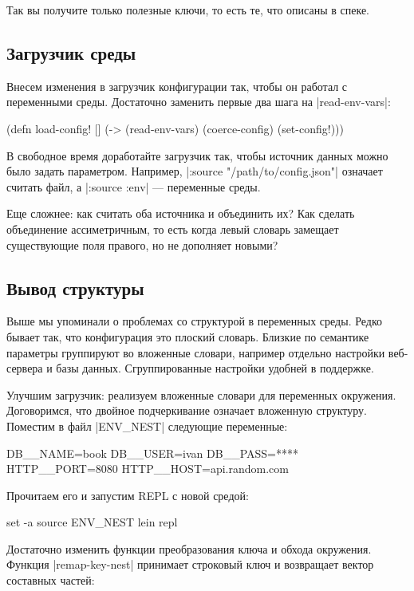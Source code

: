 Так вы получите только полезные ключи, то есть те, что описаны в спеке.

\subsection{Загрузчик среды}

Внесем изменения в загрузчик конфигурации так, чтобы он работал с переменными
среды. Достаточно заменить первые два шага на \spverb|read-env-vars|:

\begin{code}
(defn load-config!
  []
  (-> (read-env-vars)
      (coerce-config)
      (set-config!)))
\end{code}

В свободное время доработайте загрузчик так, чтобы источник данных можно было
задать параметром. Например, \spverb|:source "/path/to/config.json"| означает считать
файл, а \spverb|:source :env| — переменные среды.

Еще сложнее: как считать оба источника и объединить их? Как сделать объединение
ассиметричным, то есть когда левый словарь замещает существующие поля правого,
но не дополняет новыми?

\subsection{Вывод структуры}

Выше мы упоминали о проблемах со структурой в переменных среды. Редко бывает
так, что конфигурация это плоский словарь. Близкие по семантике параметры
группируют во вложенные словари, например отдельно настройки веб-сервера и базы
данных. Сгруппированные настройки удобней в поддержке.

Улучшим загрузчик: реализуем вложенные словари для переменных
окружения. Договоримся, что двойное подчеркивание означает вложенную
структуру. Поместим в файл \spverb|ENV_NEST| следующие переменные:

\begin{code}
DB__NAME=book
DB__USER=ivan
DB__PASS=****
HTTP__PORT=8080
HTTP__HOST=api.random.com
\end{code}

Прочитаем его и запустим REPL с новой средой:

\begin{code}
set -a
source ENV_NEST
lein repl
\end{code}

Достаточно изменить функции преобразования ключа и обхода окружения. Функция
\spverb|remap-key-nest| принимает строковый ключ и возвращает вектор составных частей:

